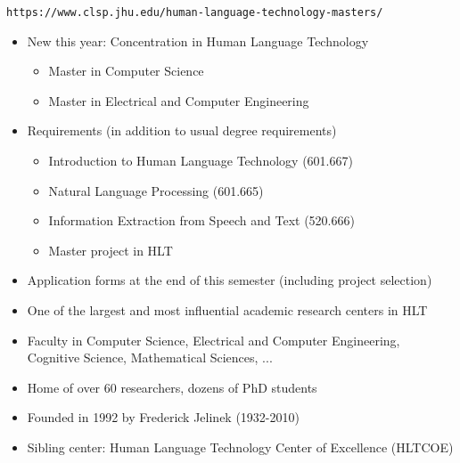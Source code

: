\documentclass[landscape]{jhuslides3C}
\begin{document}
\vfill
\begin{center}
\tt https://www.clsp.jhu.edu/human-language-technology-masters/
\end{center}
\begin{itemize}
\item New this year: Concentration in Human Language Technology
\begin{itemize}
\item Master in Computer Science
\item Master in Electrical and Computer Engineering
\end{itemize}
\item Requirements (in addition to usual degree requirements)
\begin{itemize}
\item Introduction to Human Language Technology (601.667)
\item Natural Language Processing (601.665)
\item Information Extraction from Speech and Text (520.666)
\item Master project in HLT
\end{itemize}
\item Application forms at the end of this semester (including project selection)
\end{itemize}
\vfill


\vfill
\begin{itemize}
\item One of the largest and most influential academic research centers in HLT
\item Faculty in Computer Science, Electrical and Computer Engineering, Cognitive Science, Mathematical Sciences, ...
\item Home of over 60 researchers, dozens of PhD students
\item Founded in 1992 by Frederick Jelinek (1932-2010)
\item Sibling center: Human Language Technology Center of Excellence (HLTCOE)
\end{itemize}
\vfill

\end{document}
